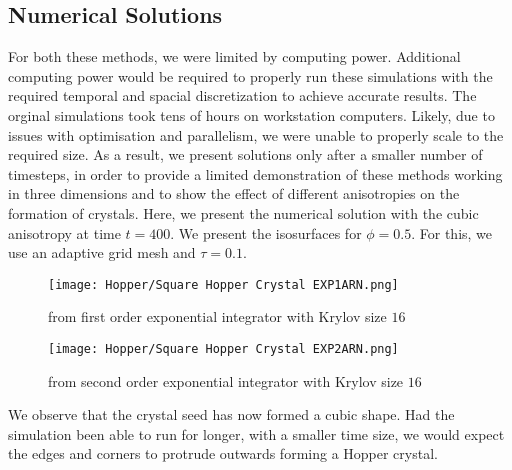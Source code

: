 \subsection{Numerical Solutions}
For both these methods, we were limited by computing power.
Additional computing power would be required to properly run these simulations with the required temporal and spacial discretization to achieve accurate results.
The orginal simulations took tens of hours on workstation computers.
Likely, due to issues with optimisation and parallelism, we were unable to properly scale to the required size.
As a result, we present solutions only after a smaller number of timesteps, in order to provide a limited demonstration of these methods working in three dimensions and to show the effect of different anisotropies on the formation of crystals.
Here, we present the numerical solution with the cubic anisotropy at time $t=400$.
We present the isosurfaces for $\phi = 0.5$.
For this, we use an adaptive grid mesh and $\tau = 0.1$.
\begin{figure}[H]
    \centering
    \begin{minipage}{0.49\textwidth}
        \texttt{[image: Hopper/Square Hopper Crystal EXP1ARN.png]} %
        \caption{from first order exponential integrator with Krylov size $16$}
        \label{fig:first order 8 0.5}
    \end{minipage}\hfill
    \centering
    \begin{minipage}{0.49\textwidth}
        \texttt{[image: Hopper/Square Hopper Crystal EXP2ARN.png]} %
        \caption{from second order exponential integrator with Krylov size $16$}
        \label{fig:first order 10 0.5}
    \end{minipage}\hfill
\end{figure}
We observe that the crystal seed has now formed a cubic shape.
Had the simulation been able to run for longer, with a smaller time size, we would expect the edges and corners to protrude outwards forming a Hopper crystal.


